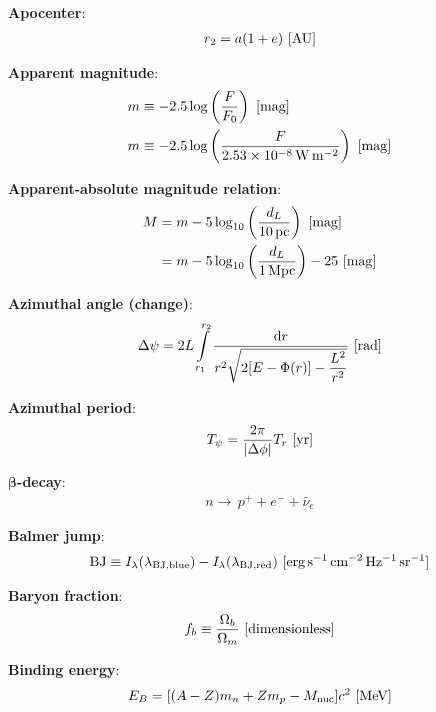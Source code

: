\documentclass[a4paper,10pt]{article}
\begin{document}
{\noindent}\textbf{Apocenter}:
\begin{align*}
    r_2 = a(1+e) ~ [{\rm AU}]
\end{align*}

{\noindent}\textbf{Apparent magnitude}:
\begin{align*}
     m &\equiv -2.5\log\left(\frac{F}{F_0}\right) ~ [{\rm mag}] \\
     m &\equiv -2.5\log\left(\frac{F}{2.53\times10^{-8}\,{\rm W\,m^{-2}}}\right) ~ [{\rm mag}]
\end{align*}

{\noindent}\textbf{Apparent-absolute magnitude relation}:
\begin{align*}
    M &= m -5\log_{10}\left(\frac{d_L}{10\,{\rm pc}}\right) ~ [{\rm mag}] \\
      &= m -5\log_{10}\left(\frac{d_L}{1\,{\rm Mpc}}\right)-25 ~ [{\rm mag}]
\end{align*}

{\noindent}\textbf{Azimuthal angle (change)}:
\begin{align*}
    \Delta\psi = 2L\int\limits_{r_1}^{r_2} \frac{{\rm d}r}{r^2\sqrt{2[E-\Phi(r)]-\dfrac{L^2}{r^2}}} ~ [{\rm rad}]
\end{align*}

{\noindent}\textbf{Azimuthal period}:
\begin{align*}
    T_\psi = \frac{2\pi}{\lvert\Delta\phi\rvert}T_r ~ [{\rm yr}]
\end{align*}

{\noindent}\textbf{$\mathbf{\beta}$-decay}:
\begin{align*}
    n \rightarrow\,p^+ + e^- + \bar{\nu}_e
\end{align*}

{\noindent}\textbf{Balmer jump}:
\begin{align*}
    {\rm BJ}\equiv I_\lambda(\lambda_{\rm BJ,blue}) - I_\lambda(\lambda_{\rm BJ,red}) ~ [{\rm erg\,s^{-1}\,cm^{-2}\,Hz^{-1}\,sr^{-1}}]
\end{align*}

{\noindent}\textbf{Baryon fraction}:
\begin{align*}
    f_b \equiv \frac{\Omega_b}{\Omega_m} ~ [{\rm dimensionless}]
\end{align*}

{\noindent}\textbf{Binding energy}:
\begin{align*}
    E_B = [(A-Z)m_n+Zm_p-M_{\rm nuc}]c^2  ~ [{\rm MeV}]
\end{align*}
\end{document}
